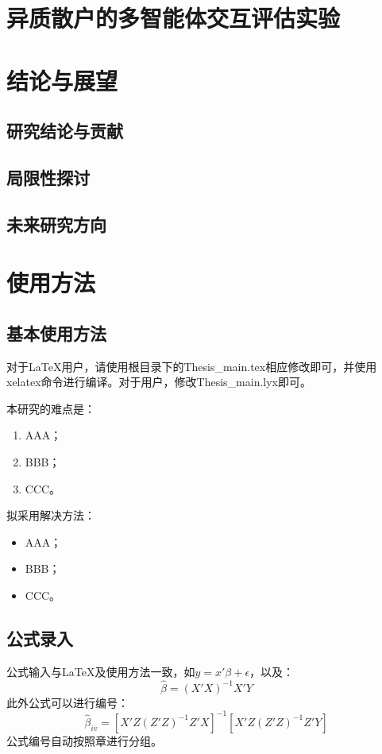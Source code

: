 \documentclass{sufethesismas}
\newcommand{\zhiheng}[1]{{\color{red}{\bf\sf [ZH: #1]}}}
\begin{document}
\chapter{异质散户的多智能体交互评估实验}
\chapter{结论与展望}
\section{研究结论与贡献}
\section{局限性探讨}
\section{未来研究方向}
\zhiheng{第三章：仿真实验}


\chapter{使用方法}


\section{基本使用方法}

对于\LaTeX{}用户，请使用根目录下的Thesis\_main.tex相应修改即可，并使用xelatex命令进行编译。对于用户，修改Thesis\_main.lyx即可。


本研究的难点是：
\begin{enumerate}
	\item AAA；
	\item BBB；
	\item CCC。
\end{enumerate}

拟采用解决方法：
\begin{itemize}
	\item AAA；
	\item BBB；
	\item CCC。
\end{itemize}


\section{公式录入}

公式输入与\LaTeX{}及使用方法一致，如$y=x'\beta+\epsilon$，以及：
\[
\hat{\beta}=\left(X'X\right)^{-1}X'Y
\]
此外公式可以进行编号：
\begin{equation}
\hat{\beta}_{iv}=\left[X'Z\left(Z'Z\right)^{-1}Z'X\right]^{-1}\left[X'Z\left(Z'Z\right)^{-1}Z'Y\right]
\end{equation}
公式编号自动按照章进行分组。
\end{document}
